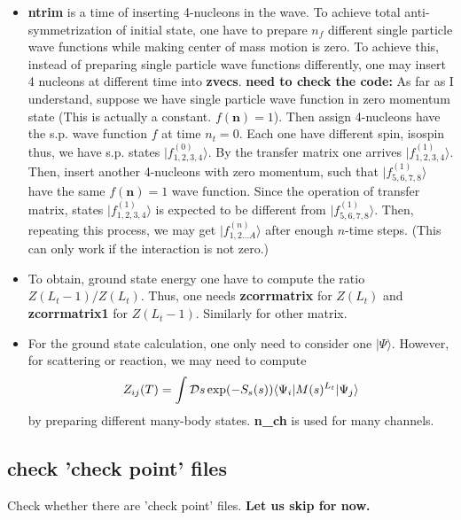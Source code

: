 \documentclass[10pt]{book}
\def\bm{\boldsymbol}
\newcommand{\bea}{\begin{eqnarray}}
\newcommand{\eea}{\end{eqnarray}}
\def\la{\langle}
\def\ra{\rangle}
\begin{document}
\begin{itemize}
\item {\bf ntrim} is a time of inserting 4-nucleons in the wave. To achieve total anti-symmetrization
      of initial state, one have to prepare $n_f$ different single particle wave functions
      while making center of mass motion is zero. To achieve this, instead of preparing 
      single particle wave functions differently, one may insert 4 nucleons at different time
      into {\bf zvecs}.
      {\bf need to check the code:} As far as I understand, suppose we have single particle wave function in zero momentum state (This is actually a constant. $f({\bm n})=1$). Then assign 4-nucleons have the s.p. wave function $f$ at time $n_t=0$. Each one have different spin, isospin thus, we have s.p. states $|f^{(0)}_{1,2,3,4}\ra $.
      By the transfer matrix one arrives $|f^{(1)}_{1,2,3,4}\ra $. Then, insert another 4-nucleons with zero momentum,
      such that $|f^{(1)}_{5,6,7,8}\ra$ have the same $f({\bm n})=1$ wave function. Since the operation of transfer
      matrix, states $|f^{(1)}_{1,2,3,4}\ra$ is expected to be different from $|f^{(1)}_{5,6,7,8}\ra$. 
      Then, repeating this process, we may get $|f^{(n)}_{1,2\dots A}\ra$ after enough $n$-time steps. 
      (This can only work if the interaction is not zero.)
\item To obtain, ground state energy one have to compute the ratio $Z(L_t-1)/Z(L_t)$. 
      Thus, one needs {\bf zcorrmatrix} for $Z(L_t)$ and {\bf zcorrmatrix1} for $Z(L_t-1)$. 
      Similarly for other matrix. 
      
\item For the ground state calculation, one only need to consider one $|\Psi\ra$.
      However, for scattering or reaction, we may need to compute 
      \bea 
      Z_{ij}(T)=\int {\cal D}s \exp(-S_{s}(s))\la \Psi_i| M(s)^{L_t}|\Psi_j\ra 
      \eea 
      by preparing different many-body states. {\bf n\_ch} is used for many channels. 
             
\end{itemize}

\subsection{check 'check point' files } 
Check whether there are 'check point' files. {\bf Let us skip for now.}
\end{document}
